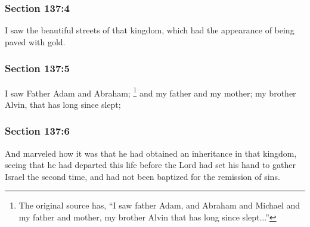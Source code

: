 	\subsubsection{Section 137:4} %
		\label{DC137-4}

		I saw the beautiful streets of that kingdom, which had the appearance of being paved with gold.


	\subsubsection{Section 137:5} %
		\label{DC137-5}

		I saw Father Adam and Abraham;%
			\footnote{%
				The original source has, ``I saw father Adam, and Abraham and Michael and my father and mother, my brother Alvin that has long since slept...''
				}
		and my father and my mother; my brother Alvin, that has long since slept;


	\subsubsection{Section 137:6} %
		\label{DC137-6}

		And marveled how it was that he had obtained an inheritance in that kingdom, seeing that he had departed this life before the Lord had set his hand to gather Israel the second time, and had not been baptized for the remission of sins.


